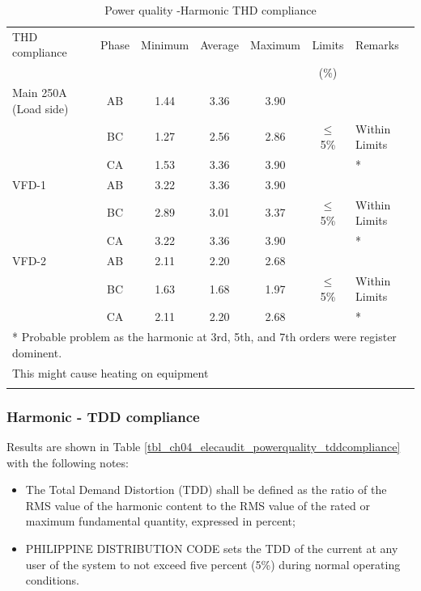 \begin{table}[!htb]
	\caption{Power quality -Harmonic THD compliance}
	\label{tbl_ch04_elecaudit_powerquality_thdcompliance}
	{\scriptsize
		
		\begin{tabular}{l|c|c|c|c|c|l}
			\hline
			THD compliance & Phase & Minimum & Average & Maximum & Limits & Remarks \\ 
			&  &  &  &  & (\%) &  \\ 
			\hline
			Main 250A (Load side) & AB & 1.44 & 3.36 & 3.90 &  &  \\ 
			& BC & 1.27 & 2.56 & 2.86 & $\leq$ 5\% & Within  Limits \\ 
			& CA & 1.53 & 3.36 & 3.90 &  & * \\ 
			\hline
			VFD-1 & AB & 3.22 & 3.36 & 3.90 &  &  \\ 
			& BC & 2.89 & 3.01 & 3.37 & $\leq$ 5\% & Within Limits \\ 
			& CA & 3.22 & 3.36 & 3.90 &  & * \\ 
			\hline
			VFD-2 & AB & 2.11 & 2.20 & 2.68 &  &  \\ 
			& BC & 1.63 & 1.68 & 1.97 & $\leq$ 5\% & Within Limits \\ 
			& CA & 2.11 & 2.20 & 2.68 &  & * \\ 
			\hline
			\multicolumn{7}{l}{* Probable problem as the harmonic at 3rd, 5th, and 7th orders were register dominent. } \\ 
			\multicolumn{7}{l}{This might cause heating on equipment} \\ 
			\multicolumn{7}{l}{} \\ 
		\end{tabular}

	
		
	}%
\end{table}





\subsubsection{Harmonic - TDD compliance}

Results are shown in Table \ref{tbl_ch04_elecaudit_powerquality_tddcompliance} with the following notes:

\begin{itemize}
	\item The Total Demand Distortion (TDD) shall be defined as the ratio of the RMS 		value of the harmonic content to the RMS value of the rated or maximum 			fundamental quantity, expressed 	in percent;
	
		\item PHILIPPINE 	DISTRIBUTION CODE sets the TDD of the current at any user of the system to not exceed five percent (5\%) during normal operating conditions.
	  
\end{itemize}

